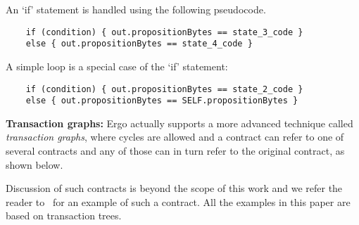 \documentclass[runningheads]{llncs}
\newcommand{\node}{\mathsf{t}}
\begin{document}

An `if' statement is handled using the following pseudocode. 

\begin{verbatim}
    if (condition) { out.propositionBytes == state_3_code }
    else { out.propositionBytes == state_4_code }
\end{verbatim}

A simple loop is a special case of the `if' statement:
\begin{verbatim}
    if (condition) { out.propositionBytes == state_2_code }
    else { out.propositionBytes == SELF.propositionBytes }
\end{verbatim}


\textbf{Transaction graphs:} Ergo actually supports a more advanced technique called {\em transaction graphs}, where cycles are allowed and a contract can refer to one of several contracts and any of those can in turn refer to the original contract, as shown below.


Discussion of such contracts is beyond the scope of this work and we refer the reader to~\cite[Section 3.3.3]{advtutorial} for an example of such a contract. All the examples in this paper are based on transaction trees.
\end{document}
